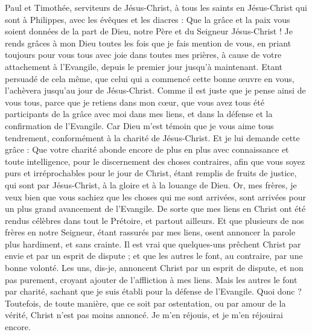 \begin{multicols}{2}
\VerseOne{}Paul et Timothée, serviteurs de Jésus-Christ, à tous les saints en Jésus-Christ qui sont à Philippes, avec les évêques et les diacres :
Que la grâce et la paix vous soient données de la part de Dieu, notre Père et du Seigneur Jésus-Christ !
Je rends grâces à mon Dieu toutes les fois que je fais mention de vous,
en priant toujours pour vous tous avec joie dans toutes mes prières,
à cause de votre attachement à l'Evangile, depuis le premier jour jusqu'à maintenant.
Etant persuadé de cela même, que celui qui a commencé cette bonne œuvre en vous, l'achèvera jusqu'au jour de Jésus-Christ.
Comme il est juste que je pense ainsi de vous tous, parce que je retiens dans mon cœur, que vous avez tous été participants de la grâce avec moi dans mes liens, et dans la défense et la confirmation de l'Evangile.
Car Dieu m'est témoin que je vous aime tous tendrement, conformément à la charité de Jésus-Christ.
Et je lui demande cette grâce : Que votre charité abonde encore de plus en plus avec connaissance et toute intelligence,
pour le discernement des choses contraires, afin que vous soyez purs et irréprochables pour le jour de Christ,
étant remplis de fruits de justice, qui sont par Jésus-Christ, à la gloire et à la louange de Dieu.
Or, mes frères, je veux bien que vous sachiez que les choses qui me sont arrivées, sont arrivées pour un plus grand avancement de l'Evangile.
De sorte que mes liens en Christ ont été rendus célèbres dans tout le Prétoire, et partout ailleurs. 
Et que plusieurs de nos frères en notre Seigneur, étant rassurés par mes liens, osent annoncer la parole plus hardiment, et sans crainte. 
Il est vrai que quelques-uns prêchent Christ par envie et par un esprit de dispute ; et que les autres le font, au contraire, par une bonne volonté. 
Les uns, dis-je, annoncent Christ par un esprit de dispute, et non pas purement, croyant ajouter de l'affliction à mes liens.
Mais les autres le font par charité, sachant que je suis établi pour la défense de l'Evangile.
Quoi donc ? Toutefois, de toute manière, que ce soit par ostentation, ou par amour de la vérité, Christ n'est pas moins annoncé. Je m'en réjouis, et je m'en réjouirai encore.

\end{multicols}
